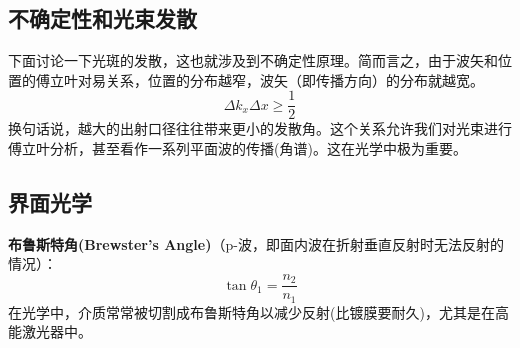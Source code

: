 \documentclass[12pt]{ctexart}%
\begin{document}
\subsection*{不确定性和光束发散}
下面讨论一下光斑的发散，这也就涉及到不确定性原理。简而言之，由于波矢和位置的傅立叶对易关系，位置的分布越窄，波矢（即传播方向）的分布就越宽。
\begin{equation}
    \Delta k_x\Delta x \geq \frac{1}{2}
\end{equation}
换句话说，越大的出射口径往往带来更小的发散角。这个关系允许我们对光束进行傅立叶分析，甚至看作一系列平面波的传播(角谱)。这在光学中极为重要。
\subsection*{界面光学}
\textbf{布鲁斯特角(Brewster's Angle)}（p-波，即面内波在折射垂直反射时无法反射的情况）：
\begin{equation}
    \tan \theta_1 = \frac{n_2}{n_1}
\end{equation}
在光学中，介质常常被切割成布鲁斯特角以减少反射(比镀膜要耐久)，尤其是在高能激光器中。
\end{document}
